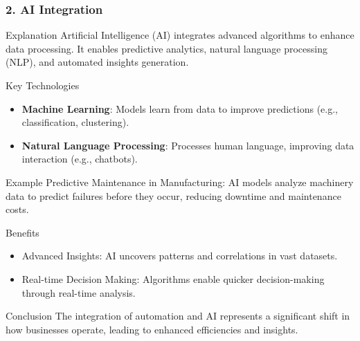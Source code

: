 \documentclass[aspectratio=169]{beamer}
\begin{document}
\begin{frame}[fragile]
    \frametitle{2. AI Integration}
    \begin{block}{Explanation}
    Artificial Intelligence (AI) integrates advanced algorithms to enhance data processing. 
    It enables predictive analytics, natural language processing (NLP), and automated insights generation.
    \end{block}

    \begin{block}{Key Technologies}
    \begin{itemize}
        \item \textbf{Machine Learning}: Models learn from data to improve predictions (e.g., classification, clustering).
        \item \textbf{Natural Language Processing}: Processes human language, improving data interaction (e.g., chatbots).
    \end{itemize}
    \end{block}

    \begin{block}{Example}
    Predictive Maintenance in Manufacturing: AI models analyze machinery data to predict failures before they occur, reducing downtime and maintenance costs.
    \end{block}

    \begin{block}{Benefits}
    \begin{itemize}
        \item Advanced Insights: AI uncovers patterns and correlations in vast datasets.
        \item Real-time Decision Making: Algorithms enable quicker decision-making through real-time analysis.
    \end{itemize}
    \end{block}
    
    \begin{block}{Conclusion}
    The integration of automation and AI represents a significant shift in how businesses operate, leading to enhanced efficiencies and insights.
    \end{block}
\end{frame}
\end{document}

